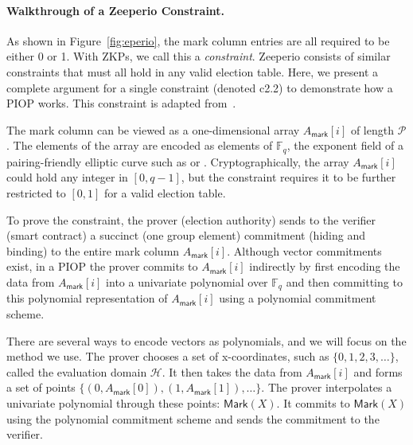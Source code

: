 \paragraph{Walkthrough of a Zeeperio Constraint.}
As shown in Figure~\ref{fig:eperio}, the mark column entries are all required to be either 0 or 1. 
With ZKPs, we call this a \textit{constraint}. 
Zeeperio consists of \constraints similar constraints that must all hold in any valid election table. 
Here, we present a complete argument for a single constraint (denoted c2.2) to demonstrate how a PIOP works. 
This constraint is adapted from~\cite{BFGW19}. 

The mark column can be viewed as a one-dimensional array $A_\mathsf{mark}[i]$ of length $\mathcal{P}$. 
The elements of the array are encoded as elements of $\mathbb{F}_q$, the exponent field of a pairing-friendly elliptic curve such as \altbn or \bls. 
Cryptographically, the array $A_\mathsf{mark}[i]$ could hold any integer in $[0,q-1]$, but the constraint requires it to be further restricted to $[0,1]$ for a valid election table.

To prove the constraint, the prover (election authority) sends to the verifier (smart contract) a succinct (one group element) commitment (hiding and binding) to the entire mark column $A_\mathsf{mark}[i]$. 
Although vector commitments exist, in a PIOP the prover commits to $A_\mathsf{mark}[i]$ indirectly by first encoding the data from $A_\mathsf{mark}[i]$ into a univariate polynomial over $\mathbb{F}_q$ and then committing to this polynomial representation of $A_\mathsf{mark}[i]$ using a polynomial commitment scheme.

There are several ways to encode vectors as polynomials, and we will focus on the method we use. 
The prover chooses a set of x-coordinates, such as $\{0,1,2,3,\ldots\}$, called the evaluation domain $\mathcal{H}$. 
It then takes the data from $A_\mathsf{mark}[i]$ and forms a set of points $\{(0,A_\mathsf{mark}[0]),(1,A_\mathsf{mark}[1]),\ldots\}$. 
The prover interpolates a univariate polynomial through these points: $\mathsf{Mark}(X)$. 
It commits to $\mathsf{Mark}(X)$ using the polynomial commitment scheme and sends the commitment to the verifier.

